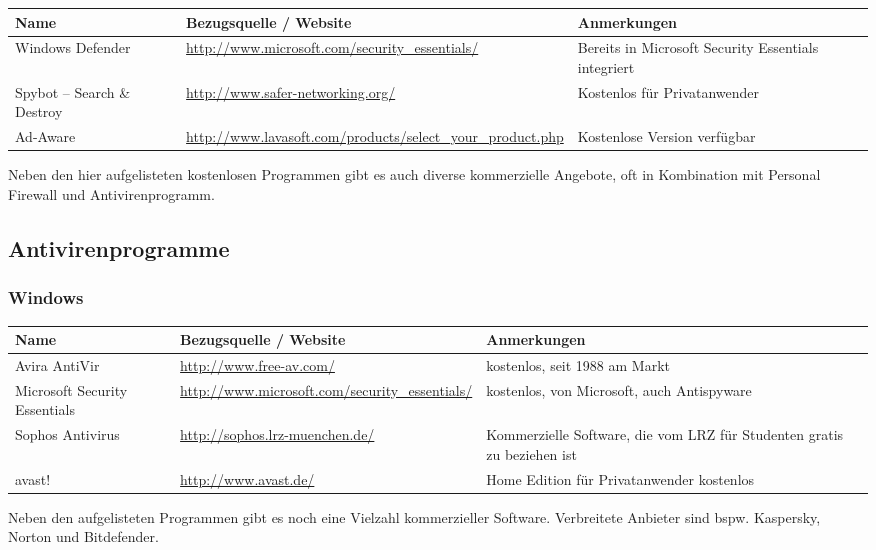 \documentclass[a4paper,12pt]{scrartcl}
\begin{document}
\begin{center}
  \begin{tabularx}{\linewidth}{|p{.18\linewidth}Xp{.3\linewidth}|}
    \hline
    Name & Bezugsquelle / Website & Anmerkungen\\
    \hline \hline
    Windows Defender & \url{http://www.microsoft.com/security_essentials/} & Bereits in Microsoft Security Essentials integriert \\
    \hline
    Spybot – Search \& Destroy & \url{http://www.safer-networking.org/} & Kostenlos für Privatanwender\\
    \hline
    Ad-Aware & \url{http://www.lavasoft.com/products/select\_your\_product.php} & Kostenlose Version verfügbar\\
    \hline
  \end{tabularx}
\end{center}
Neben den hier aufgelisteten kostenlosen Programmen gibt es auch diverse kommerzielle Angebote, oft in Kombination mit Personal Firewall und Antivirenprogramm.


\subsection*{Antivirenprogramme}
\subsubsection*{Windows}
\begin{center}
  \begin{tabularx}{\linewidth}{|p{.2\linewidth}XX|}
    \hline
    Name & Bezugsquelle / Website & Anmerkungen\\
    \hline \hline
    Avira AntiVir & \url{http://www.free-av.com/} & kostenlos, seit 1988 am Markt\\
    \hline
    Microsoft Security Essentials & \url{http://www.microsoft.com/security\_essentials/} & kostenlos, von Microsoft, auch Antispyware\\
    \hline
    Sophos Antivirus & \url{http://sophos.lrz-muenchen.de/} & Kommerzielle Software, die vom LRZ für Studenten gratis zu beziehen ist\\
    \hline
    avast! & \url{http://www.avast.de/} & Home Edition für Privatanwender kostenlos\\
    \hline
  \end{tabularx}
\end{center}
Neben den aufgelisteten Programmen gibt es noch eine Vielzahl kommerzieller Software. Verbreitete Anbieter sind bspw. Kaspersky, Norton und Bitdefender.
\end{document}

